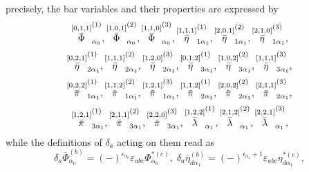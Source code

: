 \documentclass[a4paper,12pt]{article}
\begin{document}
precisely, the bar variables and their properties are expressed by 
\begin{equation}
\stackrel{\left[ 0,1,1\right] }{\bar{\Phi}}_{\alpha _{0}}^{(1)},\stackrel{%
\left[ 1,0,1\right] }{\bar{\Phi}}_{\alpha _{0}}^{(2)},\stackrel{\left[
1,1,0\right] }{\bar{\Phi}}_{\alpha _{0}}^{(3)},\stackrel{\left[ 1,1,1\right] 
}{\bar{\eta}}_{1\alpha _{1}}^{(1)},\stackrel{\left[ 2,0,1\right] }{\bar{\eta}%
}_{1\alpha _{1}}^{(2)},\stackrel{\left[ 2,1,0\right] }{\bar{\eta}}_{1\alpha
_{1}}^{(3)},  \label{sp3.42}
\end{equation}
\begin{equation}
\stackrel{\left[ 0,2,1\right] }{\bar{\eta}}_{2\alpha _{1}}^{(1)},\stackrel{%
\left[ 1,1,1\right] }{\bar{\eta}}_{2\alpha _{1}}^{(2)},\stackrel{\left[
1,2,0\right] }{\bar{\eta}}_{2\alpha _{1}}^{(3)},\stackrel{\left[
0,1,2\right] }{\bar{\eta}}_{3\alpha _{1}}^{(1)},\stackrel{\left[
1,0,2\right] }{\bar{\eta}}_{3\alpha _{1}}^{(2)},\stackrel{\left[
1,1,1\right] }{\bar{\eta}}_{3\alpha _{1}}^{(3)},  \label{sp3.43}
\end{equation}
\begin{equation}
\stackrel{\left[ 0,2,2\right] }{\bar{\pi}}_{1\alpha _{1}}^{(1)},\stackrel{%
\left[ 1,1,2\right] }{\bar{\pi}}_{1\alpha _{1}}^{(2)},\stackrel{\left[
1,2,1\right] }{\bar{\pi}}_{1\alpha _{1}}^{(3)},\stackrel{\left[ 1,1,2\right] 
}{\bar{\pi}}_{2\alpha _{1}}^{(1)},\stackrel{\left[ 2,0,2\right] }{\bar{\pi}}%
_{2\alpha _{1}}^{(2)},\stackrel{\left[ 2,1,1\right] }{\bar{\pi}}_{2\alpha
_{1}}^{(3)},  \label{sp3.44}
\end{equation}
\begin{equation}
\stackrel{\left[ 1,2,1\right] }{\bar{\pi}}_{3\alpha _{1}}^{(1)},\stackrel{%
\left[ 2,1,1\right] }{\bar{\pi}}_{3\alpha _{1}}^{(2)},\stackrel{\left[
2,2,0\right] }{\bar{\pi}}_{3\alpha _{1}}^{(3)},\stackrel{\left[ 1,2,2\right] 
}{\bar{\lambda}}_{\alpha _{1}}^{(1)},\stackrel{\left[ 2,1,2\right] }{\bar{%
\lambda}}_{\alpha _{1}}^{(2)},\stackrel{\left[ 2,2,1\right] }{\bar{\lambda}}%
_{\alpha _{1}}^{(3)},  \label{sp3.45}
\end{equation}
while the definitions of $\delta _{a}$ acting on them read as 
\begin{equation}
\delta _{a}\bar{\Phi}_{\alpha _{0}}^{(b)}=\left( -\right) ^{\epsilon
_{\alpha _{0}}}\varepsilon _{abc}\Phi _{\alpha _{0}}^{*(c)},\;\delta _{a}%
\bar{\eta}_{d\alpha _{1}}^{(b)}=\left( -\right) ^{\epsilon _{\alpha
_{1}}+1}\varepsilon _{abc}\eta _{d\alpha _{1}}^{*(c)},  \label{sp3.46}
\end{equation}
\end{document}
